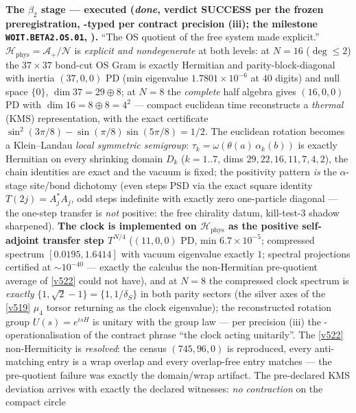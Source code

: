 \documentclass[11pt,a4paper]{article}
\begin{document}
\par\smallskip\noindent\textbf{The $\beta_2$ stage --- executed (\emph{done}, verdict SUCCESS
per the frozen preregistration, \mC-typed per contract precision (iii); the milestone
\texttt{WOIT.BETA2.OS.01}, ).} ``The OS quotient of
the free system made explicit.'' $\mathcal H_{\mathrm{phys}} = \mathcal A_+/\mathcal N$ is
\emph{explicit and nondegenerate} at both levels: at $N = 16$ ($\deg\le2$) the $37{\times}37$
bond-cut OS Gram is exactly Hermitian and parity-block-diagonal with inertia $(37, 0, 0)$ PD
(min eigenvalue $1.7801\times10^{-6}$ at $40$ digits) and null space $\{0\}$,
$\dim 37 = 29 \oplus 8$; at $N = 8$ the \emph{complete} half algebra gives $(16, 0, 0)$ PD
with $\dim 16 = 8 \oplus 8 = 4^2$ --- compact euclidean time reconstructs a \emph{thermal}
(KMS) representation, with the exact certificate
$\sin^2(3\pi/8) - \sin(\pi/8)\sin(5\pi/8) = 1/2$. The euclidean rotation becomes a
Klein--Landau \emph{local symmetric semigroup}: $\tau_k = \omega(\theta(a)\,\alpha_k(b))$ is
exactly Hermitian on every shrinking domain $D_k$ ($k = 1..7$, dims $29, 22, 16, 11, 7, 4,
2$), the chain identities are exact and the vacuum is fixed; the positivity pattern \emph{is}
the $\alpha$-stage site/bond dichotomy (even steps PSD via the exact square identity
$T(2j) = A_j^*A_j$, odd steps indefinite with exactly zero one-particle diagonal --- the
one-step transfer is \emph{not} positive: the free chirality datum, kill-test-3 shadow
sharpened). \textbf{The clock is implemented on $\mathcal H_{\mathrm{phys}}$ as the positive
self-adjoint transfer step $T^{N/4}$} ($(11,0,0)$ PD, min $6.7\times10^{-5}$; compressed
spectrum $[0.0195, 1.6414]$ with vacuum eigenvalue exactly $1$; spectral projections
certified at $\sim10^{-40}$ --- exactly the calculus the non-Hermitian pre-quotient average
of \vref{v522} could not have), and at $N = 8$ the compressed clock spectrum is
\emph{exactly} $\{1, \sqrt2 - 1\} = \{1, 1/\delta_S\}$ in both parity sectors (the silver
axes of the \vref{v519} $\mu_4$ torsor returning as the clock eigenvalue); the reconstructed
rotation group $U(s) = e^{isH}$ is unitary with the group law --- per precision (iii) the
\mC-operationalisation of the contract phrase ``the clock acting unitarily''. The
\vref{v522} non-Hermiticity is \emph{resolved}: the census $(745, 96, 0)$ is reproduced,
every anti-matching entry is a wrap overlap and every overlap-free entry matches --- the
pre-quotient failure was exactly the domain/wrap artifact. The pre-declared KMS deviation
arrives with exactly the declared witnesses: \emph{no contraction} on the compact circle
\end{document}
